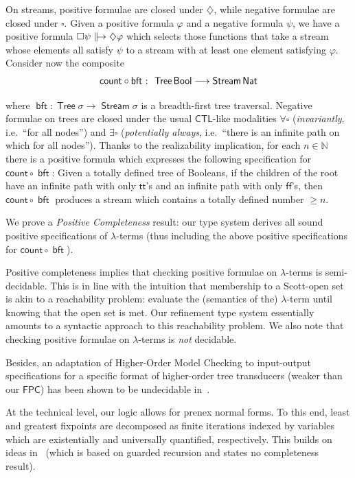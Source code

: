 \documentclass[%
  a4paper,
  UKenglish,
  cleveref,
  autoref,
  thm-restate,
  numberwithinsect,
]{lipics-v2021}
\newcommand\CTL{\mathsf{CTL}}
\newcommand\FPC{\mathsf{FPC}}
\newcommand\longto\longrightarrow
\newcommand\NN{\mathbb{N}}
\newcommand\comp{\mathbin\circ}
\renewcommand{\Box}{\square}
\newcommand{\Diam}{\diamondsuit}
\newcommand\term[1]{\mathsf{#1}}
\newcommand\type[1]{\term{#1}}
\newcommand\cnt{\term{count}}
\newcommand\bft{\mathop{\term{bft}}}
\newcommand\arrow\to
\newcommand\longarrow\longto
\newcommand\Bool{\type{Bool}}
\newcommand\Nat{\type{Nat}}
\newcommand\Stream{\mathop{\type{Stream}}}
\newcommand\Tree{\mathop{\type{Tree}}}
\newcommand\true{\term{tt}}
\newcommand\false{\term{ff}}
\newcommand\defrealto{\mathrel\parallel\joinrel\to}
\newcommand\realto{\mathrel{\defrealto}}
\newcommand\PTbis{\sigma}	%
\begin{document}
On streams, positive formulae are closed under
$\Diam$, while negative formulae are closed under $\Box$.
Given a positive formula $\varphi$ and a negative formula $\psi$,
we have a positive formula $\Box \psi \realto \Diam \varphi$
which selects those functions that take a stream
whose elements all satisfy $\psi$ to a stream with at least one element
satisfying $\varphi$.
%
Consider now the composite
\begin{equation*}
\begin{array}{l @{~} l @{~~} l}
  \cnt \comp \bft
& :
& \Tree \Bool
  \longarrow
  \Stream \Nat
\end{array}
\end{equation*}

\noindent
where $\bft \colon \Tree \PTbis \arrow \Stream \PTbis$
is a breadth-first tree traversal.
Negative formulae on trees are closed under
the usual $\CTL$-like modalities $\forall\Box$
(\emph{invariantly}, i.e.\ ``for all nodes'')
and $\exists\Box$
(\emph{potentially always},
i.e.\ ``there is an infinite path on which for all nodes'').
Thanks to the realizability implication, 
for each $n \in \NN$ there is a positive
formula which expresses the following specification for $\cnt \comp \bft$:
Given a totally defined tree of Booleans,
if the children of the root have an infinite path with only $\true$'s
and an infinite path with only $\false$'s,
then $\cnt \comp \bft$ produces a stream which contains a totally
defined number $\geq n$.

We prove a \emph{Positive Completeness} result: our type system
derives all sound positive specifications of $\lambda$-terms
(thus including the above positive specifications for $\cnt \comp \bft$).

Positive completeness implies that
checking positive formulae on $\lambda$-terms is semi-decidable.
This is in line with the intuition that 
membership to a Scott-open set is akin to a reachability problem:
evaluate the (semantics of the) $\lambda$-term until knowing that the open set is met.
Our refinement type system essentially amounts to a
syntactic approach to this reachability problem.
%
We also note that checking positive formulae on $\lambda$-terms
is \emph{not} decidable.

Besides, an adaptation of Higher-Order Model Checking
to input-output specifications for a specific format
of higher-order tree transducers (weaker than our $\FPC$)
has been shown to be undecidable in~\cite{ktu10popl}.

At the technical level, 
our logic allows for prenex normal forms.
To this end, least and greatest fixpoints are decomposed
as finite iterations indexed by variables which are
existentially and universally quantified, respectively.
This builds on ideas in~\cite{jr21esop}
(which is based on guarded recursion and states no completeness result).
\end{document}

